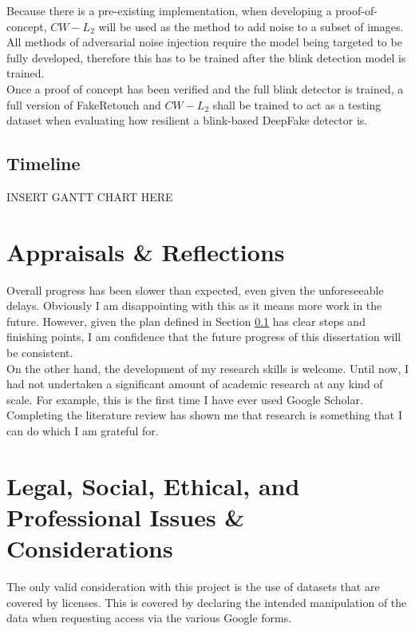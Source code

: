 \documentclass{article}
\begin{document}
Because there is a pre-existing implementation\cite{cwl2python}, when developing a proof-of-concept, $CW-L_2$ will be used as the method to add noise to a subset of images. All methods of adversarial noise injection require the model being targeted to be fully developed, therefore this has to be trained after the blink detection model is trained.\\

Once a proof of concept has been verified and the full blink detector is trained, a full version of FakeRetouch and $CW-L_2$ shall be trained to act as a testing dataset when evaluating how resilient a blink-based DeepFake detector is.

\subsection{Timeline} \label{sec:timeline}

{\huge INSERT GANTT CHART HERE}

\section{Appraisals \& Reflections}

Overall progress has been slower than expected, even given the unforeseeable delays. Obviously I am disappointing with this as it means more work in the future. However, given the plan defined in Section \ref{sec:timeline} has clear steps and finishing points, I am confidence that the future progress of this dissertation will be consistent.\\

On the other hand, the development of my research skills is welcome. Until now, I had not undertaken a significant amount of academic research at any kind of scale. For example, this is the first time I have ever used Google Scholar. Completing the literature review has shown me that research is something that I can do which I am grateful for.

\section{Legal, Social, Ethical, and Professional Issues \& Considerations}

The only valid consideration with this project is the use of datasets that are covered by licenses. This is covered by declaring the intended manipulation of the data when requesting access via the various Google forms.\\
\end{document}
